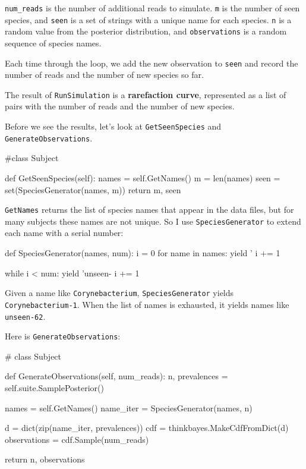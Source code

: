 \documentclass[12pt]{book}
\theoremstyle{exercise}
\newcommand{\py}[1]{{\tt #1}}%
\begin{document}
\verb"num_reads" is the number of additional reads to simulate.
\py{m} is the number of seen species, and \py{seen} is a set of
strings with a unique name for each species.
\py{n} is a random value from the posterior distribution, and
\py{observations} is a random sequence of species names.

Each time through the loop, we add the new observation to
\py{seen} and record the number of reads and the number of
new species so far.

The result of \py{RunSimulation} is a {\bf rarefaction curve},
represented as a list of pairs with the number of reads and
the number of new species.

Before we see the results, let's look at \py{GetSeenSpecies} and
\py{GenerateObservations}.

\begin{code}
#class Subject

    def GetSeenSpecies(self):
        names = self.GetNames()
        m = len(names)
        seen = set(SpeciesGenerator(names, m))
        return m, seen
\end{code}

\py{GetNames} returns the list of species names that appear in
the data files, but for many subjects these names are not unique.
So I use \py{SpeciesGenerator} to extend each name with a serial
number:

\begin{code}
def SpeciesGenerator(names, num):
    i = 0
    for name in names:
        yield '%
        i += 1

    while i < num:
        yield 'unseen-%
        i += 1
\end{code}

Given a name like \py{Corynebacterium}, \py{SpeciesGenerator} yields
\py{Corynebacterium-1}.  When the list of names is exhausted, it
yields names like \py{unseen-62}.

Here is \py{GenerateObservations}:

\begin{code}
# class Subject

    def GenerateObservations(self, num_reads):
        n, prevalences = self.suite.SamplePosterior()

        names = self.GetNames()
        name_iter = SpeciesGenerator(names, n)

        d = dict(zip(name_iter, prevalences))
        cdf = thinkbayes.MakeCdfFromDict(d)
        observations = cdf.Sample(num_reads)

        return n, observations
\end{code}
\end{document}
